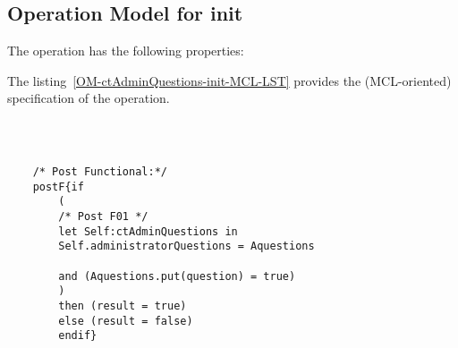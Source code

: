 \subsection{Operation Model for init}

\label{OM-init}


The  operation has the following properties:

	\begin{operationmodel}



		


	\end{operationmodel}



	\vspace{1cm}
	The listing~\ref{OM-ctAdminQuestions-init-MCL-LST} provides the \msrmessir (MCL-oriented) specification of the operation.
	
	\scriptsize
	\vspace{0.5cm}
	\begin{lstlisting}[style=MessirStyle,firstnumber=auto,captionpos=b,caption={\msrmessir (MCL-oriented) specification of the operation \emph{init}.},label=OM-ctAdminQuestions-init-MCL-LST]

	
	
	/* Post Functional:*/ 
	postF{if
		(
		/* Post F01 */
		let Self:ctAdminQuestions in
		Self.administratorQuestions = Aquestions
		
		and (Aquestions.put(question) = true)
		)
		then (result = true)
		else (result = false)
		endif}
	
	
	\end{lstlisting}
	\normalsize 
	
	
	
	





